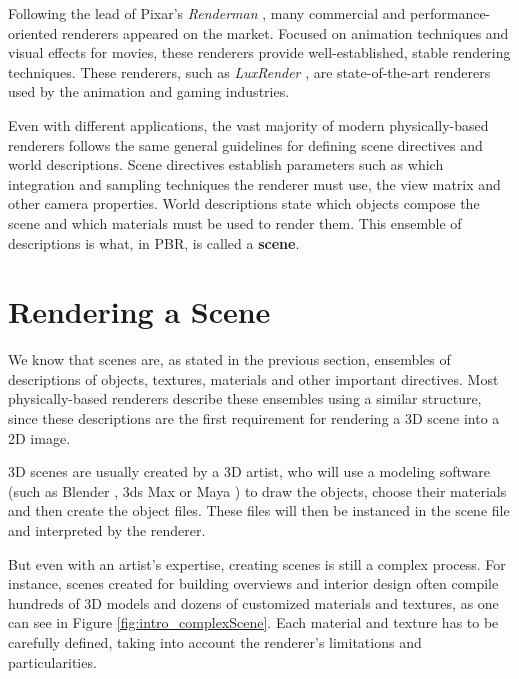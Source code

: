 Following the lead of Pixar's \textit{Renderman} \cite{renderman}, many 
commercial and performance-oriented renderers appeared on the market. Focused on 
animation techniques and visual effects for movies, these renderers provide 
well-established, stable rendering techniques. These renderers, such as 
\textit{LuxRender} \cite{luxrender}, are 
state-of-the-art renderers used by the animation and gaming industries.

Even with different applications, the vast majority of modern physically-based renderers 
follows the same general guidelines for defining scene directives and world 
descriptions. Scene directives establish parameters such as which integration 
and sampling techniques the renderer must use, the view matrix and other camera 
properties. World descriptions state which objects compose the scene and which 
materials must be used to render them. This ensemble of descriptions is what, in 
PBR, is called a \textbf{scene}.

\section{Rendering a Scene}
We know that scenes are, as stated in the previous section, ensembles of descriptions of objects, textures, materials and other important directives. Most physically-based renderers describe these ensembles using a similar structure, since these descriptions are the first requirement for rendering a 3D scene into a 2D image. 

3D scenes are usually created by a 3D artist, who will use a modeling 
software (such as Blender \cite{blender}, 3ds Max \cite{3dsmax} or Maya \cite{maya}) to draw the objects, choose their 
materials and then create the object files. These files will then be instanced 
in the scene file and interpreted by the renderer.

But even with an artist’s expertise, creating scenes is still a complex process. 
For instance, scenes created for building overviews and interior design often 
compile hundreds of 3D models and dozens of customized materials and textures, 
as one can see in Figure \ref{fig:intro_complexScene}. Each material and texture 
has to be carefully defined, taking into account the renderer's limitations and 
particularities.

